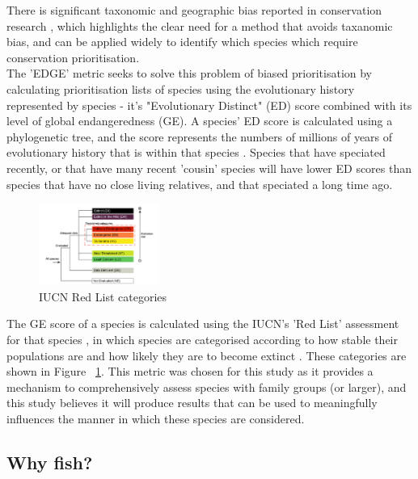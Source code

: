 \documentclass[11pt]{article}
\begin{document}
There is significant taxonomic and geographic bias 
reported in conservation research \autocite{Clark2002, Darwall2011, 
Watson2017}, which highlights the clear need for a method that avoids 
taxanomic bias, and can be applied widely to identify which species which 
require conservation 
prioritisation. \\ The 
'EDGE' metric seeks to solve this problem of biased prioritisation by 
calculating prioritisation lists of species using the evolutionary history 
represented by species - it's "Evolutionary Distinct" (ED) score combined with 
its level of global endangeredness (GE). A species' ED score is calculated 
using a phylogenetic 
tree, and the score represents the numbers of millions of years of evolutionary 
history that is within that species \autocite{Isaac2007}. Species that have 
speciated recently, or that have many recent 'cousin' species will have lower 
ED scores than species that have no close living relatives, and that speciated 
a long time ago. 

\begin{figure}
	
	\includegraphics[width=0.35\textwidth]{Images/RedListCategories.png}
	\caption{IUCN Red List categories \\  \autocite{IUCN2000} }
	\label{IUCNcategories}
	
\end{figure}

The GE score of a species is calculated using the IUCN's 'Red 
List' assessment for that species \autocite{Isaac2007}, in which species are 
categorised according to how stable their populations are and how likely they 
are to become extinct \autocite{IUCN2000}. These categories are shown in Figure 
~\ref{IUCNcategories}. This metric was chosen for this 
study as it provides a mechanism to comprehensively assess species with family 
groups (or larger), and this study believes it will produce results that can be 
used to meaningfully influences the manner in which these species are 
considered. 

\subsection{Why fish?}
\end{document}
